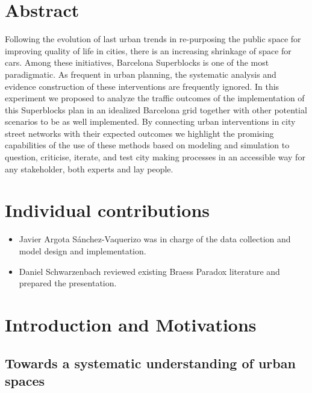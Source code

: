 \documentclass[11pt]{article}
\begin{document}
\section{Abstract}

Following the evolution of last urban trends in re-purposing the public space for improving quality of life in cities, there is an increasing shrinkage of space for cars. Among these initiatives, Barcelona Superblocks is one of the most paradigmatic. As frequent in urban planning, the systematic analysis and evidence construction of these interventions are frequently ignored. In this experiment we proposed to analyze the traffic outcomes of the implementation of this Superblocks plan in an idealized Barcelona grid together with other potential scenarios to be as well implemented. By connecting urban interventions in city street networks with their expected outcomes we highlight the promising capabilities of the use of these methods based on modeling and simulation to question, criticise, iterate, and test city making processes in an accessible way for any stakeholder, both experts and lay people.    

\section{Individual contributions}

\begin{itemize}
    \item Javier Argota Sánchez-Vaquerizo was in charge of the data collection and model design and implementation.
    \item Daniel Schwarzenbach reviewed existing Braess Paradox literature and prepared the presentation.
\end{itemize}

\section{Introduction and Motivations}

\subsection {Towards a systematic understanding of urban spaces}
\end{document}
